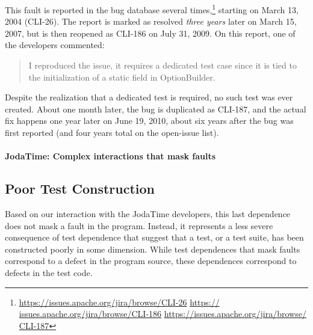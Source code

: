 This fault is reported in the bug
database several times,\footnote{\url{https://issues.apache.org/jira/browse/CLI-26} \url{https://
issues.apache.org/jira/browse/CLI-186} \url{https://issues.apache.org/jira/browse/
CLI-187}} starting on March 13, 2004 (CLI-26). The report is marked as resolved
\emph{three years} later on March 15, 2007, but is then reopened as CLI-186 on
July 31, 2009. On this report, one of the developers commented:
\begin{quote}
I reproduced the issue, it requires a dedicated test case since it is tied to the initialization 
of a static field in OptionBuilder.
\end{quote}
Despite the realization that a dedicated test is required, no such
test was ever created.
About one month later, the bug is duplicated as CLI-187, and the
actual fix happens one 
year later on June 19, 2010, about six years after the bug was first reported (and four years
total on the open-issue list).


\newcommand{\jodatime}{JodaTime\xspace}
\paragraph{\jodatime: Complex interactions that mask faults}
\label{sec:jodatime}


\subsection{Poor Test Construction}\label{sec:examples:initialization}

Based on our interaction with the \jodatime developers, this last
dependence does not
mask a fault in the program.  Instead, it represents a less severe consequence of test
dependence that suggest that a test, or a test suite, 
has been constructed poorly in some dimension.  While test dependences that mask faults
correspond to a defect
in the program source, these dependences correspond to defects in the test code.
%

